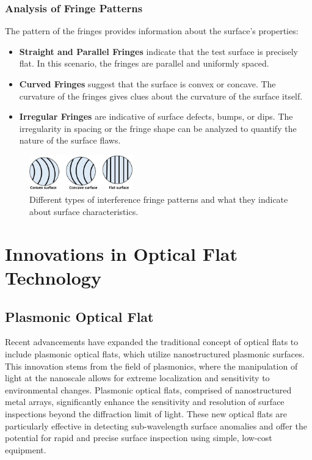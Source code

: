 \documentclass[../main.tex]{subfiles}
\begin{document}
\subsubsection{Analysis of Fringe Patterns}
\vspace{-8pt}
The pattern of the fringes provides information about the surface's properties:
\vspace{-4pt}
\begin{itemize}
    \setlength{\itemsep}{0.1mm}
    \item \textbf{Straight and Parallel Fringes} indicate that the test surface is precisely flat. In this scenario, the fringes are parallel and uniformly spaced.
    \item \textbf{Curved Fringes} suggest that the surface is convex or concave. The curvature of the fringes gives clues about the curvature of the surface itself.
    \item \textbf{Irregular Fringes} are indicative of surface defects, bumps, or dips. The irregularity in spacing or the fringe shape can be analyzed to quantify the nature of the surface flaws.
\end{itemize}

\begin{figure}[H]
    \centering
    \includegraphics[width=0.4\textwidth]{Images/Introduction/fringe_types2}
    \vspace{-8pt}
    \caption{Different types of interference fringe patterns and what they indicate about surface characteristics.\cite{Joji_2023}}
    \label{fig:fringe-types}
\end{figure}

\section{Innovations in Optical Flat Technology}
\vspace{-15pt}
\subsection{Plasmonic Optical Flat}
\vspace{-15pt}
Recent advancements have expanded the traditional concept of optical flats to include plasmonic optical flats, which utilize nanostructured plasmonic surfaces. This innovation stems from the field of plasmonics, where the manipulation of light at the nanoscale allows for extreme localization and sensitivity to environmental changes. Plasmonic optical flats, comprised of nanostructured metal arrays, significantly enhance the sensitivity and resolution of surface inspections beyond the diffraction limit of light. These new optical flats are particularly effective in detecting sub-wavelength surface anomalies and offer the potential for rapid and precise surface inspection using simple, low-cost equipment.\cite{WOS:000387461800007}
\vspace{-15pt}
\end{document}
